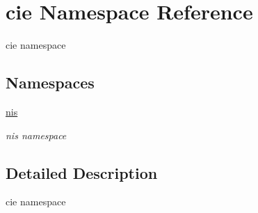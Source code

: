 \hypertarget{namespacecie}{\section{cie Namespace Reference}
\label{namespacecie}
}


cie namespace  


\subsection*{Namespaces}
\begin{DoxyCompactItemize}
\item 
\hyperlink{namespacecie_1_1nis}{nis}
\begin{DoxyCompactList}\small\item\em nis namespace \end{DoxyCompactList}\end{DoxyCompactItemize}


\subsection{Detailed Description}
cie namespace 